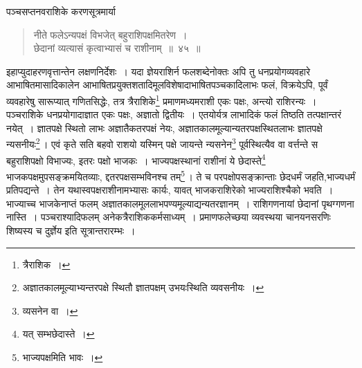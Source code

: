\documentclass[10pt, openany]{book}
\begin{document}
{{

\vspace{0.2cm}{लब्धं सुवर्णाः १२२, माषाः ८, रक्तिकाः ४, भागाः ३६ छे ४१~।}


\newpage

{पञ्चसप्तनवराशिके करणसूत्रमार्या\textemdash}

 \label{45}
\begin{quote}
    
{\bs नीते फलेऽन्यपक्षं विभजेत् बहुराशिपक्षमितरेण~। \\
 छेदानां व्यत्यासं कृत्वाभ्यासं च राशीनाम्~॥~४५~॥} \end{quote}

{इहाप्युदाहरणवृत्तान्तेन लक्षणनिर्देशः~। यदा ज्ञेयराशिर्न फलशब्देनोक्तः
अपि तु}
{धनप्रयोगव्यवहारे आभाषितमासादिकालेन आभाषितप्रयुक्तशतादिमूलविशेषादाभाषितपञ्चकादिलाभः फलं, विक्रयेऽपि, पूर्वं व्यवहारेषु सारूप्यात् गणितसिद्धेः,
तत्र त्रैराशिके\renewcommand{\thefootnote}{\s १}\footnote{\s त्रैराशिक~।}}
{प्रमाणमध्यमराशी एकः पक्षः, अन्त्यो राशिरन्यः~। पञ्चराशिके
धनप्रयोगादाज्ञात एकः पक्षः,}
{अज्ञातो द्वितीयः~। एतयोर्यत्र लाभादिकं फलं तिष्ठति तत्पक्षान्तरं नयेत्~। ज्ञातपक्षे स्थितो}
{लाभः अज्ञातैकतरपक्षं नेयः, अज्ञातकालमूल्यान्यतरपक्षस्थितलाभः ज्ञातपक्षे
न्यसनीयः\renewcommand{\thefootnote}{\s २}\footnote{\s अज्ञातकालमूल्याभ्यन्तरपक्षे स्थितौ ज्ञातपक्षम्
उभयःस्थिति व्यवसनीयः~।}\,। एवं}
{कृते सति बहवो राशयो यस्मिन् पक्षे जायन्ते न्यसनेन\renewcommand{\thefootnote}{\s ३}\footnote{\s व्यसनेन वा~।} पूर्वस्थित्यैव
वा वर्त्तन्ते स बहुराशिपक्षो 
विभाज्यः, इतरः पक्षो भाजकः~। भाज्यपक्षस्थानां राशीनां ये छेदास्ते\renewcommand{\thefootnote}{\s ४}\footnote{\s यत् सम्भछेदास्ते~।}
भाजकपक्षमुपसङ्क्रमयितव्याः, द्दतरपक्षसम्भविनश्च तम्\renewcommand{\thefootnote}{\s ५}\footnote{\s भाज्यपक्षमिति भावः~।}\,। ते च परपक्षोपसङ्क्रान्ताः
छेदधर्मं जहति,भाज्यधर्मं प्रतिपद्यन्ते~।}
{तेन यथास्वपक्षराशीनामभ्यासः कार्यः, यावत् भाजकराशिरेको भाज्यराशिश्चैको
भवति~।}
{भाज्याच्च भाजकेनाप्तं फलम् अज्ञातकालमूललाभपण्यमूल्याद्यन्यतरज्ञानम्~।
राशिगणनायां}
{छेदानां पृथग्गणना नास्ति~। पञ्चराश्यादिफलम् अनेकत्रैराशिककर्मसाध्यम्~।
प्रमाणफलेच्छया}
{व्यवस्थया चानयनसरणिः शिष्यस्य च दुर्ज्ञेय इति सूत्रान्तरारम्भः~।}

}}
\end{document}
